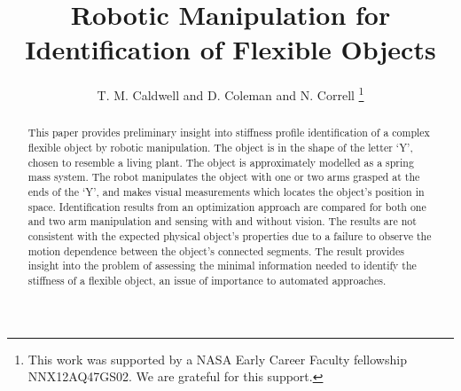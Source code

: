 \documentclass[runningheads,a4paper]{llncs}
\begin{document}
\mainmatter  %

\title{Robotic Manipulation for Identification of Flexible Objects}



\author{T. M. Caldwell and  D. Coleman and N. Correll%
\thanks{
This work was supported by a NASA
Early Career Faculty fellowship NNX12AQ47GS02. We are grateful for this support.}%
}
%


\maketitle

\begin{abstract}
This paper provides preliminary insight into stiffness profile identification of a complex flexible object by robotic manipulation. The object is in the shape of the letter `Y', chosen to resemble a living plant.  The object is approximately modelled as a spring mass system. The robot manipulates the object with one or two arms grasped at the ends of the `Y', and makes visual measurements which locates the object's position in space.  Identification results from an optimization approach are compared for both one and two arm manipulation and sensing with and without vision. The results are not consistent with the expected physical object's properties due to a failure to observe the motion dependence between the object's connected segments. The result provides insight into the problem of assessing the minimal information needed to identify the stiffness of a flexible object, an issue of importance to automated approaches.%
\end{abstract}
\end{document}
